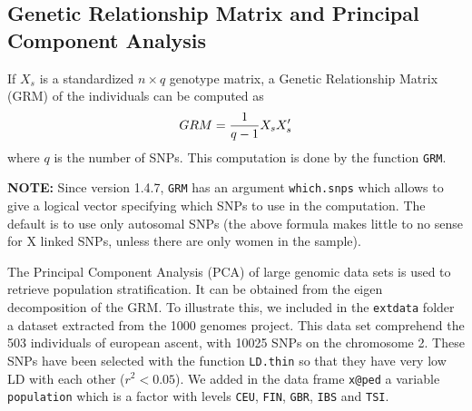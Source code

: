 \documentclass{article}
\begin{document}
\pagebreak
\subsection{Genetic Relationship Matrix and Principal Component Analysis}

  If $X_s$ is a standardized $n\times q$ genotype matrix, a Genetic Relationship Matrix 
  (GRM) of the individuals can be computed as
  \begin{equation*}
     GRM = {1\over q-1} X_sX_s'
  \end{equation*}
  where $q$ is the number of SNPs.  This computation is done by the function \verb!GRM!.  

  \textbf{NOTE:} Since version 1.4.7, \verb!GRM! has an argument \verb!which.snps! which allows 
  to give a logical vector specifying which SNPs to use in the computation. The default is to 
  use only autosomal SNPs (the above formula makes little to no sense for X linked SNPs, unless there 
  are only women in the sample).

  The Principal Component Analysis (PCA) of large genomic data sets is used to retrieve population
  stratification. It can be obtained from the eigen decomposition of the GRM. To illustrate this,
  we included in the \verb!extdata! folder a dataset extracted from the 1000 genomes project. 
  This data set comprehend the 503 individuals of european ascent, with 10025 SNPs on the chromosome
  2. These SNPs have been selected with the function \verb!LD.thin! so that they have very low 
  LD with each other ($r^2 < 0.05$). We added in the data frame \verb!x@ped! a variable \verb!population!
  which is a factor with levels \verb!CEU!, \verb!FIN!, \verb!GBR!, \verb!IBS! and \verb!TSI!.
\end{document}
